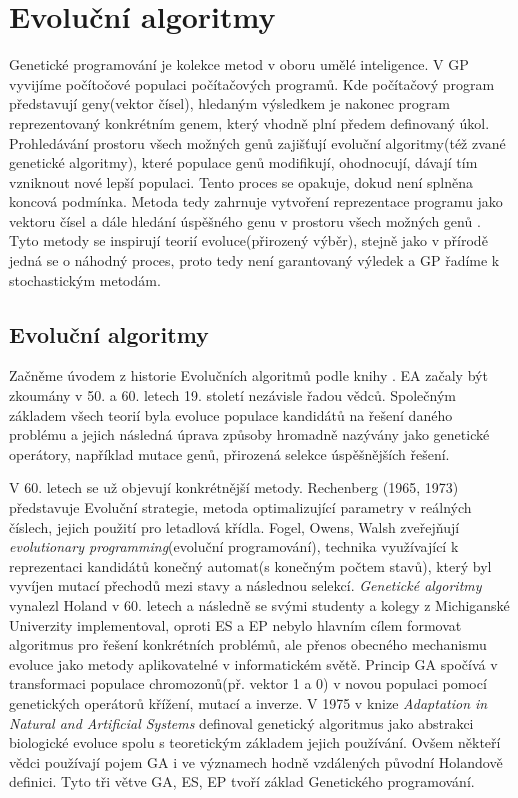 \chapter{Evoluční algoritmy}
Genetické programování je kolekce metod v oboru umělé inteligence. V  GP vyvijíme počítočové populaci počítačových programů. Kde počítačový program představují geny(vektor čísel), hledaným výsledkem je nakonec program reprezentovaný konkrétním genem, který vhodně plní předem definovaný úkol. Prohledávání prostoru všech možných genů zajišťují evoluční algoritmy(též zvané genetické algoritmy), které populace genů modifikují, ohodnocují, dávají tím vzniknout nové lepší populaci. Tento proces se opakuje, dokud není splněna koncová podmínka. Metoda tedy zahrnuje vytvoření reprezentace programu jako vektoru čísel a dále hledání úspěšného genu v prostoru všech možných genů \citep{field}. Tyto metody se inspirují teorií evoluce(přirozený výběr), stejně jako v přírodě jedná se o náhodný proces, proto tedy není garantovaný výledek a GP řadíme k stochastickým metodám. 
\section{Evoluční algoritmy}
Začněme úvodem z historie Evolučních algoritmů podle knihy \citep{MitchellBook}. EA začaly být zkoumány v 50. a 60. letech 19. století nezávisle řadou vědců. Společným základem všech teorií byla evoluce populace kandidátů na řešení daného problému a jejich následná úprava způsoby hromadně nazývány jako genetické operátory, například mutace genů, přirozená selekce úspěšnějších řešení. \par 
V 60. letech se už objevují konkrétnější metody. Rechenberg (1965, 1973) představuje Evoluční strategie, metoda optimalizující parametry v reálných číslech, jejich použití pro letadlová křídla. Fogel, Owens, Walsh zveřejňují \textit{evolutionary programming}(evoluční programování), technika využívající k reprezentaci kandidátů konečný automat(s konečným počtem stavů), který byl vyvíjen mutací přechodů mezi stavy a následnou selekcí. \textit{Genetické algoritmy} vynalezl Holand v 60. letech a následně se svými studenty a kolegy z Michiganské Univerzity implementoval, oproti ES a EP nebylo hlavním cílem formovat algoritmus pro řešení konkrétních problémů, ale přenos obecného mechanismu evoluce jako metody aplikovatelné v informatickém světě. Princip GA spočívá v transformaci populace chromozonů(př. vektor 1 a 0) v novou populaci pomocí genetických operátorů křížení, mutací a inverze. V 1975 v knize \textit{Adaptation in Natural and  Artificial Systems} \citep{HolandBook} definoval genetický algoritmus jako abstrakci biologické evoluce spolu s teoretickým základem jejich používání. Ovšem někteří vědci používají pojem GA i ve významech hodně vzdálených původní Holandově definici. Tyto tři větve GA, ES, EP tvoří základ Genetického programování. 
